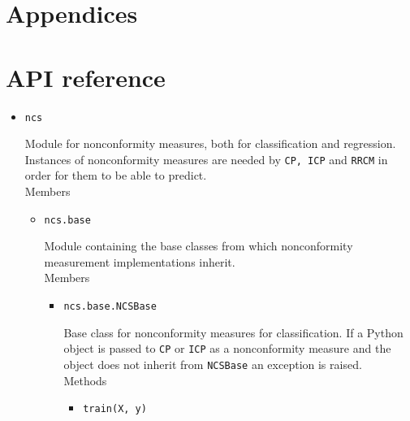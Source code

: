\documentclass[twoside,11pt]{article}
\begin{document}
\renewcommand{\appendixpagename}{}
\begin{appendices}
  \section*{Appendices}

  \section{API reference}
  \label{appendix:a}

  \begin{itemize}

    \item
      \texttt{ncs}

      Module for nonconformity measures, both for
      classification and regression.
      Instances of nonconformity measures are needed by
      \texttt{CP, ICP} and \texttt{RRCM} in order for them
      to be able to predict.
      \\

      Members

      \begin{itemize}

        \item
          \texttt{ncs.base}

          Module containing the base classes from which
          nonconformity measurement implementations
          inherit.
          \\

          Members

          \begin{itemize}

            \item
              \texttt{ncs.base.NCSBase}

              Base class for nonconformity measures for
              classification.
              If a Python object is passed to \texttt{CP}
              or \texttt{ICP} as a nonconformity measure
              and the object does not inherit from
              \texttt{NCSBase} an exception is raised.
              \\

              Methods

              \begin{itemize}

                \item
                  \texttt{train(X, y)}


\end{itemize}
\end{itemize}
\end{itemize}
\end{itemize}
\end{appendices}
\end{document}
